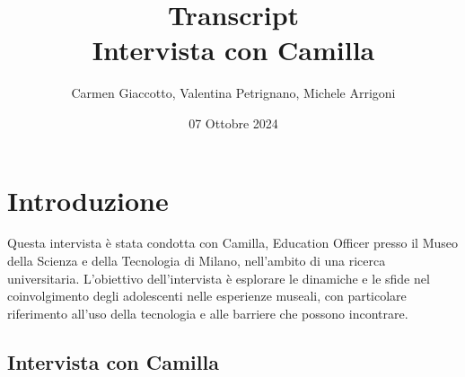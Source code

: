 \documentclass{article}
\title{Transcript \\ Intervista con Camilla}
\author{Carmen Giaccotto, Valentina Petrignano, Michele Arrigoni}
\date{07 Ottobre 2024}
\begin{document}
\maketitle


\section{Introduzione}
Questa intervista è stata condotta con Camilla, Education Officer presso il Museo della Scienza e della Tecnologia di Milano, nell'ambito di una ricerca universitaria. L'obiettivo dell'intervista è esplorare le dinamiche e le sfide nel coinvolgimento degli adolescenti nelle esperienze museali, con particolare riferimento all'uso della tecnologia e alle barriere che possono incontrare.



\subsection{\textcolor{subsectioncolor}{Intervista con Camilla}}
\end{document}

